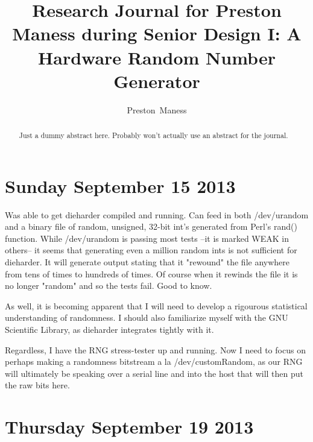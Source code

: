 \documentclass[journal]{IEEEtran}
\begin{document}
\title{Research Journal for Preston Maness during Senior Design I: 
A Hardware Random Number Generator}
\author{Preston~Maness}

%
{}

\maketitle

\begin{abstract}
Just a dummy abstract here. Probably won't actually use an abstract for the 
journal.
\end{abstract}

\tableofcontents

\section{Sunday September 15 2013}

Was able to get dieharder compiled and running. Can feed in both /dev/urandom 
and a binary file of random, unsigned, 32-bit int's generated from Perl's 
rand() function. While /dev/urandom is passing most tests --it is marked
WEAK in others-- it seems that generating even a million random ints is 
not sufficient for dieharder. It will generate output stating that it "rewound"
the file anywhere from tens of times to hundreds of times. Of course when 
it rewinds the file it is no longer "random" and so the tests fail. Good to 
know.

As well, it is becoming apparent that I will need to develop a rigourous 
statistical understanding of randomness. I should also familiarize myself with 
the GNU Scientific Library, as dieharder integrates tightly with it.

Regardless, I have the RNG stress-tester up and running. Now I need to focus 
on perhaps making a randomness bitstream a la /dev/customRandom, as our 
RNG will ultimately be speaking over a serial line and into the host that 
will then put the raw bits here.

\section{Thursday September 19 2013}
\end{document}
